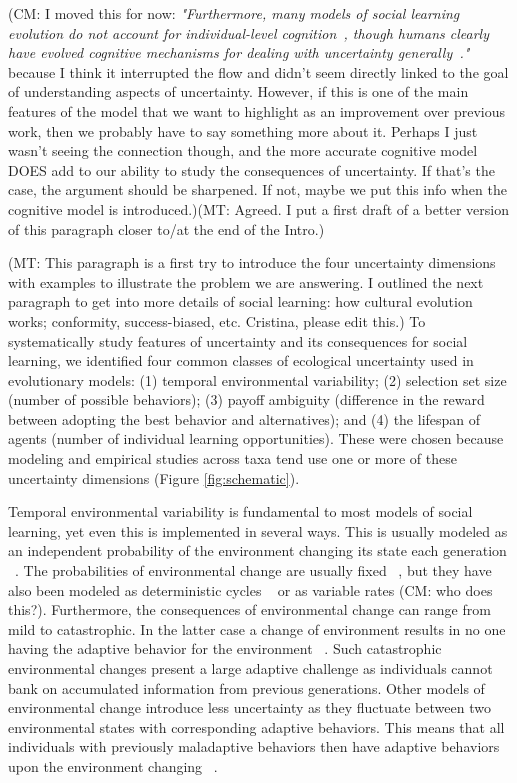 \documentclass[letterpaper,11.5pt]{scrartcl}
\newcommand{\mt}[1]{{\textcolor{myorange} {({\tiny MT:} #1)}}}
\newcommand{\cm}[1]{{\textcolor{mypurple} {({\tiny CM:} #1)}}}
\begin{document}
 \cm{I moved this for now: \emph{"Furthermore, many models of social learning evolution do not account for individual-level
cognition~\cite{Heyes2016}, though humans clearly have evolved cognitive mechanisms
for dealing with uncertainty generally~\cite{Gershman2019,Schulz2019}."} because I think it interrupted the flow and didn't seem directly linked to the goal of understanding aspects of uncertainty. However, if this is one of the main features of the model that we want to highlight as an improvement over previous work, then we probably have to say something more about it. Perhaps I just wasn't seeing the connection though, and the more accurate cognitive model DOES add to our ability to study the consequences of uncertainty. If that's the case, the argument should be sharpened. If not, maybe we put this info when the cognitive model is introduced.}\mt{Agreed. I put a first draft of a better version of this paragraph closer to/at the end of the Intro.}


\mt{This paragraph is a first try to introduce the four uncertainty dimensions
with examples to illustrate the problem we are answering.
I outlined the next paragraph to get into more details of social learning:
how cultural evolution works; conformity, success-biased, etc. Cristina, please
edit this.} 
To systematically study features of uncertainty and its consequences for social learning, we identified four common classes of ecological uncertainty used in evolutionary models: (1) temporal environmental variability; (2) selection set size (number of possible behaviors); (3) payoff
ambiguity (difference in the reward between adopting the best behavior and alternatives); and (4) the lifespan of agents (number of individual learning opportunities).
These were chosen because modeling and empirical 
studies across taxa tend use one or more of these uncertainty dimensions (Figure \ref{fig:schematic}).


Temporal environmental variability is fundamental to most models of social learning, yet even this is implemented in several ways. This is usually modeled as an independent probability of the environment changing its state each generation ~\cite{Feldman1996,McElreath2005}. The probabilities of environmental change are usually fixed ~\cite{BoydRicherson1985, Kendal2009}, but they have also been modeled as deterministic cycles ~\cite{Feldman1996} or as variable rates \cm{who does this?}. Furthermore, the consequences of environmental change can range from mild to  catastrophic. In the latter case a change of environment results in no one having the adaptive behavior for the environment ~\cite{Rogers1988}. Such catastrophic environmental changes present a large adaptive challenge as individuals cannot bank on accumulated information from previous generations. Other models of environmental change introduce less uncertainty as they fluctuate between two environmental states with corresponding adaptive behaviors. This means that all individuals with previously maladaptive behaviors then have adaptive behaviors upon the environment changing ~\cite{Perreault2012}.
\end{document}
